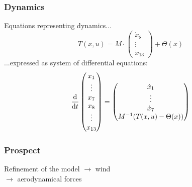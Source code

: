 	\begin{frame}
		\frametitle{Dynamics}
		Equations representing dynamics...
		\[ T(x, u) = M \cdot \begin{pmatrix} \dot{x}_{8} \\ \vdots \\ \dot{x}_{13} \end{pmatrix} + \Theta(x) \]
		\onslide<2->
		...expressed as system of differential equations:
		\[ \frac{\textup{d}}{\textup{d}t} 
			\begin{pmatrix}
						  x_{1} \\ \vdots \\ x_{7} \\ x_{8} \\ \vdots \\ x_{13}
			\end{pmatrix}
			=
			\begin{pmatrix}
							\dot{x}_{1} \\ \vdots \\ \dot{x}_{7} \\ M^{-1}(T(x,u)-\Theta(x))
			\end{pmatrix}
		\]
	\end{frame}
	
	\begin{frame}
		\frametitle{Prospect}
			Refinement of the model
			\vspace{1ex}
			\(\rightarrow\) wind \\
			\vspace{1ex}
			\(\rightarrow\) aerodynamical forces \\
	\end{frame}

%